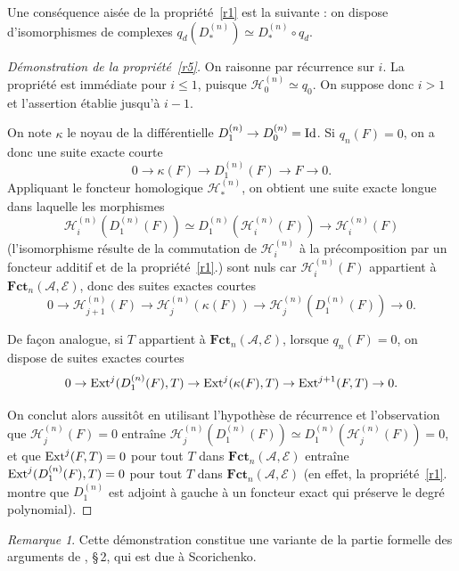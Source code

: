 \documentclass[a4paper,10pt]{article}
\newcommand{\A}{{\mathcal{A}}}
\newcommand{\fct}{\mathbf{Fct}}
\newcommand{\Hh}{{\mathcal{H}}}
\newcommand{\E}{{\mathcal{E}}}
\newcommand{\Pol}{\fct}
\theoremstyle{definition}
\theoremstyle{remark}
\newtheorem{rem}[thm]{Remarque}
\begin{document}
Une conséquence aisée de la propriété~\ref{r1} est la suivante : on dispose d'isomorphismes de complexes $q_d(D^{(n)}_*)\simeq D^{(n)}_*\circ q_d$.

\begin{proof}[Démonstration de la propriété~\ref{r5}]
On raisonne par récurrence sur $i$. La propriété est immédiate pour $i\leq 1$, puisque $\Hh^{(n)}_0\simeq q_0$. On suppose donc $i>1$ et l'assertion établie jusqu'à $i-1$.

On note $\kappa$ le noyau de la différentielle $D^{(n)}_1\to D^{(n)}_0={\rm Id}$. Si $q_n(F)=0$, on a donc une suite exacte courte
$$0\to\kappa(F)\to D^{(n)}_1(F)\to F\to 0.$$
Appliquant le foncteur homologique $\Hh^{(n)}_*$, on obtient une suite exacte longue dans laquelle les morphismes
$$\Hh^{(n)}_i(D^{(n)}_1(F))\simeq D^{(n)}_1(\Hh^{(n)}_i(F))\to\Hh^{(n)}_i(F)$$
(l'isomorphisme résulte de la commutation de $\Hh^{(n)}_i$ à la précomposition par un foncteur additif et de la propriété~\ref{r1}.) sont nuls car $\Hh^{(n)}_i(F)$ appartient à $\Pol_n(\A,\E)$, donc des suites exactes courtes
$$0\to\Hh^{(n)}_{j+1}(F)\to\Hh^{(n)}_j(\kappa(F))\to\Hh^{(n)}_j(D^{(n)}_1(F))\to 0.$$

De façon analogue, si $T$ appartient à $\Pol_n(\A,\E)$, lorsque $q_n(F)=0$, on dispose de suites exactes courtes
$$0\to {\rm Ext}^j(D^{(n)}_1(F),T) \to {\rm Ext}^j(\kappa(F),T)\to {\rm Ext}^{j+1}(F,T)\to 0.$$

On conclut alors aussitôt en utilisant l'hypothèse de récurrence et l'observation que $\Hh^{(n)}_j(F)=0$ entraîne $\Hh^{(n)}_j(D^{(n)}_1(F))\simeq D^{(n)}_1(\Hh^{(n)}_j(F))=0$, et que ${\rm Ext}^j(F,T)=0$ pour tout $T$ dans $\Pol_n(\A,\E)$ entraîne ${\rm Ext}^j(D^{(n)}_1(F),T)=0$ pour tout $T$ dans $\Pol_n(\A,\E)$ (en effet, la propriété~\ref{r1}. montre que $D^{(n)}_1$ est adjoint à gauche à un foncteur exact qui préserve le degré polynomial).
\end{proof}

\begin{rem}
 Cette démonstration constitue une variante de la partie formelle des arguments de \cite{Dja-JKT}, §\,2, qui est due à Scorichenko.
\end{rem}

\smallskip
\end{document}
